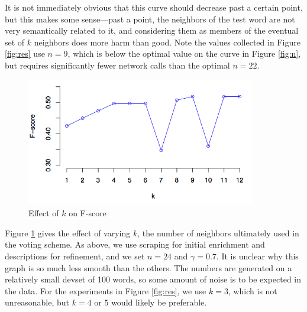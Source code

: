\documentclass{article}
\begin{document}
It is not immediately obvious that this curve should decrease past a certain point, but this makes some sense---past a point, the neighbors of the test word are not very semantically related to it, and considering them as members of the eventual set of $k$ neighbors does more harm than good.
Note the values collected in Figure \ref{fig:res} use $n=9$, which is below the optimal value on the curve in Figure \ref{fig:n}, but requires significantly fewer network calls than the optimal $n=22$.

\begin{figure}[htbp]
\begin{center}
\includegraphics[width=100mm]{graphs/k.png}
\end{center}
\caption{Effect of $k$ on F-score}
\label{fig:k}
\end{figure}
Figure \ref{fig:k} gives the effect of varying $k$, the number of neighbors ultimately used in the voting scheme.
As above, we use scraping for initial enrichment and descriptions for refinement, and we set $n=24$ and $\gamma=0.7$.
It is unclear why this graph is so much less smooth than the others.
The numbers are generated on a relatively small devset of 100 words, so some amount of noise is to be expected in the data.
For the experiments in Figure \ref{fig:res}, we use $k=3$, which is not unreasonable, but $k=4$ or $5$ would likely be preferable.
\end{document}
